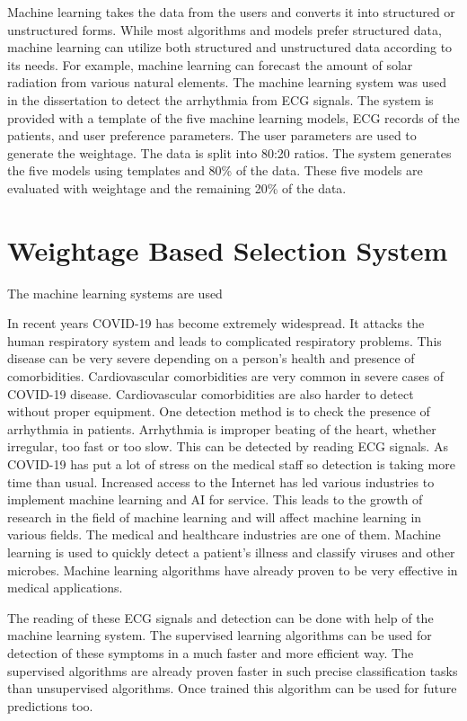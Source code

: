 Machine learning takes the data from the users and converts it into structured or unstructured forms. While most algorithms and models prefer structured data, machine learning can utilize both structured and unstructured data according to its needs. For example, machine learning can forecast the amount of solar radiation from various natural elements. The machine learning system was used in the dissertation to detect the arrhythmia from ECG signals. The system is provided with a template of the five machine learning models, ECG records of the patients, and user preference parameters. The user parameters are used to generate the weightage. The data is split into 80:20 ratios. The system generates the five models using templates and 80\% of the data. These five models are evaluated with weightage and the remaining 20\% of the data.

\section{Weightage Based Selection System}\label{sec:weightage_based_selection_system}

The machine learning systems are used

In recent years COVID-19 has become extremely widespread. It attacks the human respiratory system and leads to complicated respiratory problems. This disease can be very severe depending on a person's health and presence of comorbidities. Cardiovascular comorbidities are very common in severe cases of COVID-19 disease. Cardiovascular comorbidities are also harder to detect without proper equipment. One detection method is to check the presence of arrhythmia in patients. Arrhythmia is improper beating of the heart, whether irregular, too fast or too slow. This can be detected by reading ECG signals. As COVID-19 has put a lot of stress on the medical staff so detection is taking more time than usual. Increased access to the Internet has led various industries to implement machine learning and AI for service. This leads to the growth of research in the field of machine learning and will affect machine learning in various fields. The medical and healthcare industries are one of them. Machine learning is used to quickly detect a patient's illness and classify viruses and other microbes. Machine learning algorithms have already proven to be very effective in medical applications.

The reading of these ECG signals and detection can be done with help of the machine learning system. The supervised learning algorithms can be used for detection of these symptoms in a much faster and more efficient way. The supervised algorithms are already proven faster in such precise classification tasks than unsupervised algorithms. Once trained this algorithm can be used for future predictions too.

